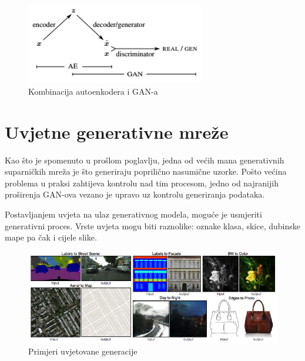 \documentclass[lmodern, utf8, seminar]{fer}
\begin{document}
\begin{figure}[H]
    \centering
    \includegraphics[width=0.7\textwidth]{vae-gan}
    \caption{Kombinacija autoenkodera i GAN-a \cite{larsen2015autoencoding}}
    \label{fig:vae-gan}
\end{figure}




\chapter{Uvjetne generativne mreže}
Kao što je spomenuto u prošlom poglavlju, jedna od većih mana generativnih suparničkih mreža je što generiraju poprilično nasumične uzorke. Pošto većina problema u praksi zahtijeva kontrolu nad tim procesom, jedno od najranijih proširenja GAN-ova vezano je upravo uz kontrolu generiranja podataka. 

Postavljanjem uvjeta na ulaz generativnog modela, moguće je usmjeriti generativni proces. Vrste uvjeta mogu biti raznolike: oznake klasa, skice, dubinske mape pa čak i cijele slike.

\begin{figure}[H]
    \centering
    \includegraphics[width=1\textwidth]{isola2017-conditioned-generation}
    \caption{Primjeri uvjetovane generacije}
    \label{fig:isola2017-conditioned-generation}
\end{figure}

\newpage
\end{document}
